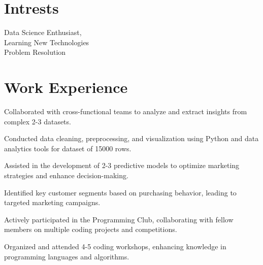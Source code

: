 \documentclass[]{deedy-resume-openfont}
\begin{document}
\begin{minipage}[t]{0.33\textwidth}
\section{Intrests}
\textbullet Data Science Enthusiast,\\
\textbullet Learning New Technologies\\
\textbullet Problem Resolution
 \\
 
\sectionsep
%
%

\end{minipage} 
\hfill
\begin{minipage}[t]{0.66\textwidth} 


\section{Work Experience}
\vspace{\topsep} %
\begin{tightemize} 
\item Collaborated with cross-functional teams to analyze and extract insights from complex 2-3 datasets.
\item Conducted data cleaning, preprocessing, and visualization using Python and data analytics tools for dataset of 15000 rows.
\item Assisted in the development of 2-3 predictive models to optimize marketing strategies and enhance decision-making.
\end{tightemize}
\sectionsep
{}
\begin{tightemize} 
\item Identified key customer segments based on purchasing behavior, leading to targeted marketing campaigns.
\end{tightemize}
\sectionsep
{}
\begin{tightemize}
\item Actively participated in the Programming Club, collaborating with fellow members on multiple coding projects and competitions.
\item Organized and attended 4-5 coding workshops, enhancing knowledge in programming languages and algorithms.
\end{tightemize}
\sectionsep


\end{minipage}
\end{document}
